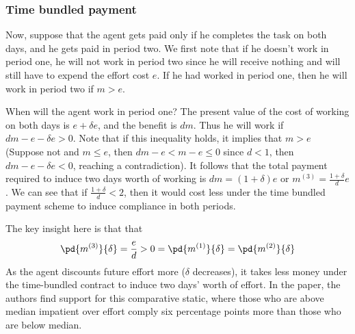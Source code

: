 \subsubsection*{Time bundled payment}
Now, suppose that the agent gets paid only if he completes the task on both days, and he gets paid in period two. We first note that if he doesn't work in period one, he will not work in period two since he will receive nothing and will still have to expend the effort cost $e$. If he had worked in period one, then he will work in period two if $m > e$. 

When will the agent work in period one? The present value of the cost of working on both days is $e + \delta e$, and the benefit is $dm$. Thus he will work if $dm - e - \delta e > 0$. Note that if this inequality holds, it implies that $m > e$ (Suppose not and $m \leq e$, then $dm - e < m - e \leq 0$ since  $d < 1$, then $dm- e - \delta e < 0$, reaching a contradiction). It follows that the total payment required to induce two days worth of working is $dm = (1 + \delta)e$ or $m^{(3)} = \frac{1 + \delta}{d}e$. We can see that if $\frac{1 + \delta}{d} < 2$, then it would cost less under the time bundled payment scheme to induce compliance in both periods. 

The key insight here is that that 
$$\pd{m^{(3)}}{\delta} = \frac{e}{d} > 0 = \pd{m^{(1)}}{\delta} = \pd{m^{(2)}}{\delta}$$
As the agent discounts future effort more ($\delta$ decreases), it takes less money under the time-bundled contract to induce two days' worth of effort. In the paper, the authors find support for this comparative static, where those who are above median impatient over effort comply six percentage points more than those who are below median.

